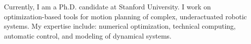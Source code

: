 

\begin{cvparagraph}

Currently, I am a Ph.D. candidate at Stanford University. I work on optimization-based tools for motion planning of complex, underactuated robotic systems. My expertise include: numerical optimization, technical computing, automatic control, and modeling of dynamical systems.
\end{cvparagraph}

